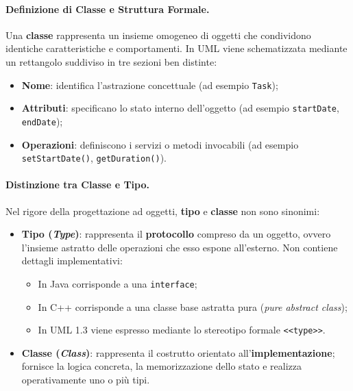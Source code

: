 \documentclass[12pt]{extarticle}
\newcommand{\cn}[1]{\makebox[\linewidth][c]{\textbf{#1}}}
\begin{document}
\paragraph{Definizione di Classe e Struttura Formale.}
Una \textbf{classe} rappresenta un insieme omogeneo di oggetti che condividono identiche caratteristiche e comportamenti. In UML viene schematizzata mediante un rettangolo suddiviso in tre sezioni ben distinte:
\begin{itemize}
    \item \textbf{Nome}: identifica l'astrazione concettuale (ad esempio \texttt{Task});
    \item \textbf{Attributi}: specificano lo stato interno dell'oggetto (ad esempio \texttt{startDate}, \texttt{endDate});
    \item \textbf{Operazioni}: definiscono i servizi o metodi invocabili (ad esempio \texttt{setStartDate()}, \texttt{getDuration()}).
\end{itemize}

\begin{figure}[htbp]
    \centering
{}
    \label{fig:uml_class_box_example}
\end{figure}

\paragraph{Distinzione tra Classe e Tipo.}
Nel rigore della progettazione ad oggetti, \textbf{tipo} e \textbf{classe} non sono sinonimi:
\begin{itemize}
    \item \textbf{Tipo (\textit{Type})}: rappresenta il \textbf{protocollo} compreso da un oggetto, ovvero l'insieme astratto delle operazioni che esso espone all'esterno. Non contiene dettagli implementativi:
    \begin{itemize}
        \item In Java corrisponde a una \texttt{interface};
        \item In C++ corrisponde a una classe base astratta pura (\textit{pure abstract class});
        \item In UML 1.3 viene espresso mediante lo stereotipo formale \texttt{<<type>>}.
    \end{itemize}
    \item \textbf{Classe (\textit{Class})}: rappresenta il costrutto orientato all'\textbf{implementazione}; fornisce la logica concreta, la memorizzazione dello stato e realizza operativamente uno o più tipi.
\end{itemize}
\end{document}
